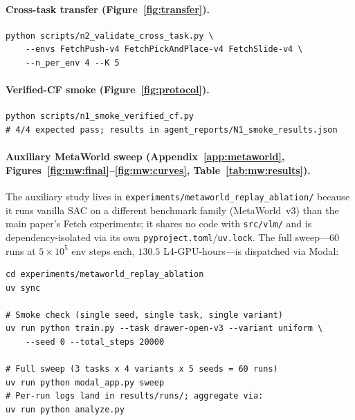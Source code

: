 \paragraph{Cross-task transfer (Figure~\ref{fig:transfer}).}
{\small
\begin{verbatim}
python scripts/n2_validate_cross_task.py \
    --envs FetchPush-v4 FetchPickAndPlace-v4 FetchSlide-v4 \
    --n_per_env 4 --K 5
\end{verbatim}}

\paragraph{Verified-CF smoke (Figure~\ref{fig:protocol}).}
{\small
\begin{verbatim}
python scripts/n1_smoke_verified_cf.py
# 4/4 expected pass; results in agent_reports/N1_smoke_results.json
\end{verbatim}}

\paragraph{Auxiliary MetaWorld sweep
(Appendix~\ref{app:metaworld},
Figures~\ref{fig:mw:final}--\ref{fig:mw:curves},
Table~\ref{tab:mw:results}).}
The auxiliary study lives in
\texttt{experiments/metaworld\_replay\_ablation/} because it runs
vanilla SAC on a different benchmark family (MetaWorld~v3) than the
main paper's Fetch experiments; it shares no code with
\texttt{src/vlm/} and is dependency-isolated via its own
\texttt{pyproject.toml}/\texttt{uv.lock}. The full sweep---$60$
runs at $5{\times}10^5$ env steps each, $130.5$ L4-GPU-hours---is
dispatched via Modal:
{\small
\begin{verbatim}
cd experiments/metaworld_replay_ablation
uv sync

# Smoke check (single seed, single task, single variant)
uv run python train.py --task drawer-open-v3 --variant uniform \
    --seed 0 --total_steps 20000

# Full sweep (3 tasks x 4 variants x 5 seeds = 60 runs)
uv run python modal_app.py sweep
# Per-run logs land in results/runs/; aggregate via:
uv run python analyze.py
\end{verbatim}}
